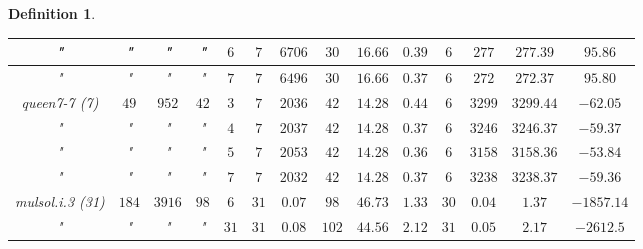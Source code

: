 \documentclass[12pt]{article}
\theoremstyle{slplain}
\newtheorem{defi}{Definition}[section]
\begin{document}
\begin{defi}
\begin{table}[H]
\begin{center}
\begin{tabular}{|c|c|c|c|c|c|c|c|c|c|c|c|c|c|}
\hline
{\small "} & {\small "} & {\small "} & {\small "} & {\small $6$} & {\small $7$} & {\small $6706$} & {\small $30$}  & {\small $16.66$} & {\small $0.39$} & {\small $6$} & {\small $277$} & {\small $277.39$} & {\small $95.86$}\\
\hline
{\small "} & {\small "} & {\small "} & {\small "} & {\small $7$} & {\small $7$} & {\small $6496$} & {\small $30$}  & {\small $16.66$} & {\small $0.37$} & {\small $6$} & {\small $272$} & {\small $272.37$} & {\small $95.80$}\\
\hline
\hline
{\small queen7-7 (7)} & {\small $49$} & {\small $952$} & {\small $42$} & {\small $3$} & {\small $7$} & {\small $2036$} & {\small $42$} & {\small $14.28$} & {\small $0.44$} & {\small $6$} & {\small $3299$} & {\small $3299.44$} & {\small $-62.05$}\\
\hline
{\small "} & {\small "} & {\small "} & {\small "} & {\small $4$} & {\small $7$} & {\small $2037$} & {\small $42$}  & {\small $14.28$} & {\small $0.37$} & {\small $6$} & {\small $3246$} & {\small $3246.37$} & {\small $-59.37$}\\
\hline
{\small "} & {\small "} & {\small "} & {\small "} & {\small $5$} & {\small $7$} & {\small $2053$} & {\small $42$}  & {\small $14.28$} & {\small $0.36$} & {\small $6$} & {\small $3158$} & {\small $3158.36$} & {\small $-53.84$}\\
\hline
{\small "} & {\small "} & {\small "} & {\small "} & {\small $7$} & {\small $7$} & {\small $2032$} & {\small $42$} & {\small $14.28$} & {\small $0.37$} & {\small $6$} & {\small $3238$} & {\small $3238.37$} & {\small $-59.36$}\\
\hline
\hline
{\small mulsol.i.3 (31)} & {\small $184$} & {\small $3916$} & {\small $98$} & {\small $6$} & {\small $31$} & {\small $0.07$} & {\small $98$} & {\small $46.73$} & {\small $1.33$} & {\small $30$} & {\small $0.04$} & {\small $1.37$} & {\small $-1857.14$}\\
\hline
{\small "} & {\small "} & {\small "} & {\small "} & {\small $31$} & {\small $31$} & {\small $0.08$} & {\small $102$} & {\small $44.56$} & {\small $2.12$} & {\small $31$} & {\small $0.05$} & {\small $2.17$} & {\small $-2612.5$}\\

\end{tabular}
\end{center}
\end{table}
\end{defi}
\end{document}
